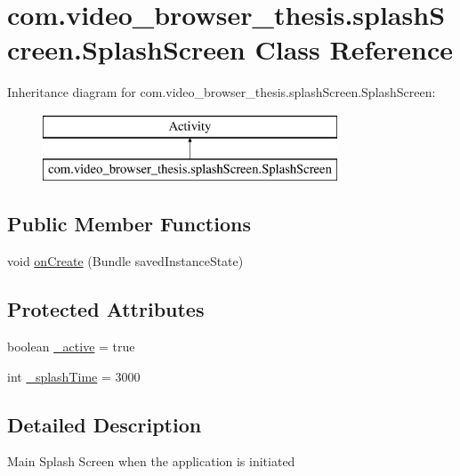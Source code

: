 \hypertarget{classcom_1_1video__browser__thesis_1_1splash_screen_1_1_splash_screen}{\section{com.\-video\-\_\-browser\-\_\-thesis.\-splash\-Screen.\-Splash\-Screen Class Reference}
\label{classcom_1_1video__browser__thesis_1_1splash_screen_1_1_splash_screen}
}
Inheritance diagram for com.\-video\-\_\-browser\-\_\-thesis.\-splash\-Screen.\-Splash\-Screen\-:\begin{figure}[H]
\begin{center}
\leavevmode
\includegraphics[height=2.000000cm]{classcom_1_1video__browser__thesis_1_1splash_screen_1_1_splash_screen}
\end{center}
\end{figure}
\subsection*{Public Member Functions}
\begin{DoxyCompactItemize}
\item 
void \hyperlink{classcom_1_1video__browser__thesis_1_1splash_screen_1_1_splash_screen_acc1210c792996037d40cf3ee64fc9905}{on\-Create} (Bundle saved\-Instance\-State)
\end{DoxyCompactItemize}
\subsection*{Protected Attributes}
\begin{DoxyCompactItemize}
\item 
boolean \hyperlink{classcom_1_1video__browser__thesis_1_1splash_screen_1_1_splash_screen_a3303300e142e61273a5efec4a9f07aff}{\-\_\-active} = true
\item 
int \hyperlink{classcom_1_1video__browser__thesis_1_1splash_screen_1_1_splash_screen_a9f208e3d4ad10a414b7b504c3560a39a}{\-\_\-splash\-Time} = 3000
\end{DoxyCompactItemize}


\subsection{Detailed Description}
Main Splash Screen when the application is initiated


